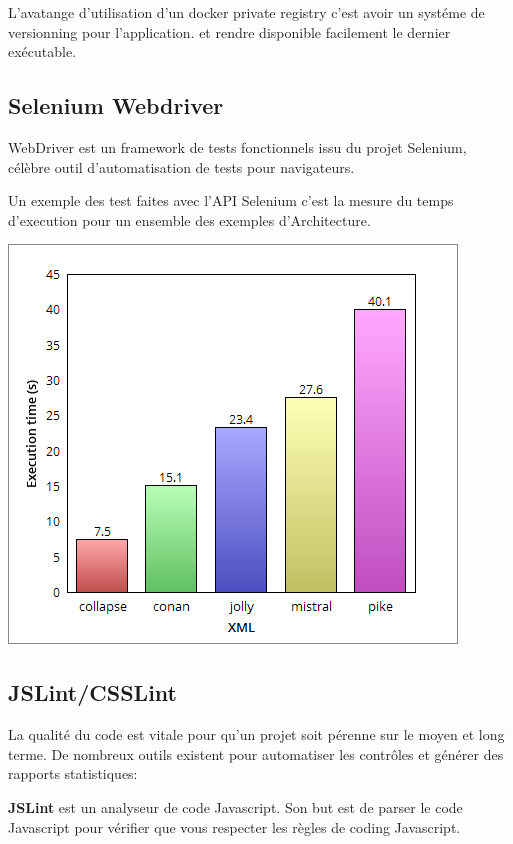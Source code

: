 \documentclass [a4paper,11pt]{article}
\begin{document}
L'avatange d'utilisation d'un docker private registry c'est avoir un systéme de versionning pour l'application. et rendre disponible facilement le dernier exécutable.
\subsection{Selenium Webdriver}
WebDriver est un framework de tests fonctionnels issu du projet Selenium, célèbre outil d'automatisation de tests pour navigateurs.\newline

Un exemple des test faites avec l'API Selenium c'est la mesure du temps d'execution pour un ensemble des exemples d'Architecture.

\begin{center}
\includegraphics[scale=0.4]{img/benchmark.png}
\end{center}

\subsection{JSLint/CSSLint}

La qualité du code est vitale pour qu'un projet soit pérenne sur le moyen et long terme. De nombreux outils existent pour automatiser les contrôles et générer des rapports statistiques:\newline

\textbf{JSLint} est un analyseur de code Javascript. Son but est de parser le code Javascript pour vérifier que vous respecter les règles de coding Javascript.\newline
\end{document}
